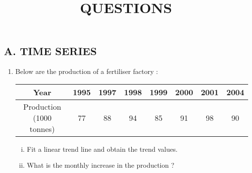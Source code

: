 \documentclass[11pt, a4paper]{article}
\title{\textbf{QUESTIONS}}
\author{}
\date{}
\begin{document}
\maketitle



\begin{center}


\section*{A. TIME SERIES}


\end{center}



\vspace{1cm}




\begin{enumerate}
	
	\item Below are the production of a fertiliser factory :
		
	\begin{table}[h]
	\def\arraystretch{1.5}
	\begin{center}
	
	\begin{tabular}{|c||c|c|c|c|c|c|c|}
	
	\hline
	
	Year & 1995 & 1997 & 1998 & 1999 & 2000 & 2001 & 2004 \\
	
	\hline
	
	Production (1000 tonnes) & 77 & 88 & 94 & 85 & 91 & 98 & 90 \\
	
	\hline
	\end{tabular}
	\end{center}
	
	\end{table}
	
	
	\begin{enumerate}[(i)]
		\item Fit a linear trend line and obtain the trend values.
		\item What is the monthly increase in the production ?
	\end{enumerate}
	
	
	
	
	
	
	
	
	
	
\vspace{2cm}
	

\end{enumerate}
\end{document}
